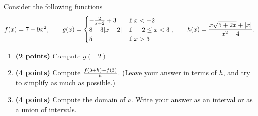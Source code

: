 \begin{tcolorbox}[colback=white,colframe=black,opacityframe=0,colbacktitle=black,title={\textbf{Problem 3 [\examproblemweight\ points]}}]
Consider the following functions 
$$f(x)=7-9x^2, \quad \quad
g(x) = 
\begin{cases}
	-\frac{2}{x+2}+3 &\text{if}~x<-2\\
	8-3|x-2|&\text{if}~-2\le x<3\\
	5&\text{if}~x>3\\
\end{cases}, 
\quad \quad
h(x) = \frac{x\sqrt{5+2x} + |x|}{x^2-4}.$$
\begin{enumerate}[label=(\alph*)]
	\item \textbf{(2 points)} Compute $g(-2)$.
	\item \textbf{(4 points)} Compute $\frac{f(3+h)-f(3)}{h}$. (Leave your answer in terms of $h$, and try to simplify as much as possible.)
	\item \textbf{(4 points)} Compute the domain of $h$. Write your answer as an interval or as a union of intervals.
\end{enumerate}
\end{tcolorbox}

\vspace*{20em}